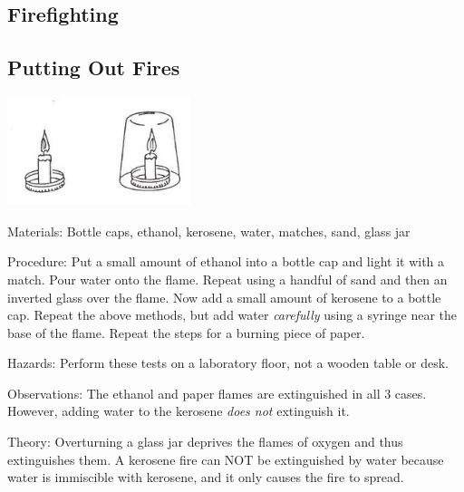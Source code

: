 \begin{multicols}{2}

\section*{Firefighting} 


\subsection{Putting Out Fires} %

\begin{center}
\includegraphics[width=0.4\textwidth]{./img/source/fire-fighting.jpg}
\end{center}

\begin{description*}
\item[Materials:]{Bottle caps, ethanol, kerosene, water, matches, sand, glass jar}
\item[Procedure:]{Put a small amount of ethanol into a bottle cap and light it with a match. Pour water onto the flame. Repeat using a handful of sand and then an inverted glass over the flame. Now add a small amount of kerosene to a bottle cap. Repeat the above methods, but add water \emph{carefully} using a syringe near the base of the flame. Repeat the steps for a burning piece of paper.}
\item[Hazards:]{Perform these tests on a laboratory floor, not a wooden table or desk.}
\item[Observations:]{The ethanol and paper flames are extinguished in all 3 cases. However, adding water to the kerosene \emph{does not} extinguish it.}
\item[Theory:]{Overturning a glass jar deprives the flames of oxygen and thus extinguishes them. A kerosene fire can NOT be extinguished by water because water is immiscible with kerosene, and it only causes the fire to spread.}
\end{description*}


\end{multicols}
